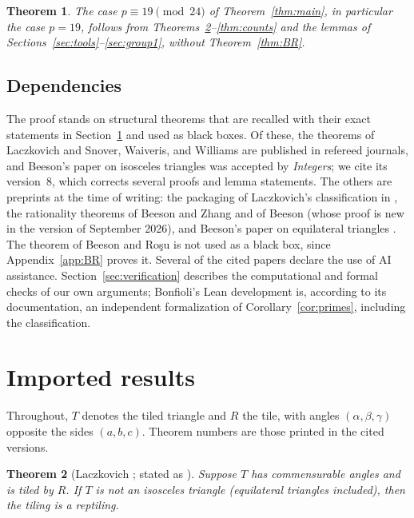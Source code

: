 \documentclass[11pt]{amsart}
\newtheorem{theorem}{Theorem}
\theoremstyle{remark}
\begin{document}
\begin{theorem}\label{thm:nineteen}
The case $p\equiv 19\pmod{24}$ of Theorem~\ref{thm:main}, in particular the case $p=19$, follows from Theorems~\ref{thm:commensurable}--\ref{thm:counts} and the lemmas of Sections~\ref{sec:tools}--\ref{sec:group1}, without Theorem~\ref{thm:BR}.
\end{theorem}

\subsection*{Dependencies}
The proof stands on structural theorems that are recalled with their exact statements in Section~\ref{sec:imports} and used as black boxes. Of these, the theorems of Laczkovich \cite{Lacz95,Lacz12} and Snover, Waiveris, and Williams \cite{SWW91} are published in refereed journals, and Beeson's paper on isosceles triangles \cite{BeesonIso} was accepted by \emph{Integers}; we cite its version~8, which corrects several proofs and lemma statements. The others are preprints at the time of writing: the packaging of Laczkovich's classification in \cite{BLZ633}, the rationality theorems of Beeson and Zhang \cite{BZRat} and of Beeson \cite[Theorem~9]{Beeson2229} (whose proof is new in the version of September 2026), and Beeson's paper on equilateral triangles \cite{BeesonEqui}. The theorem of Beeson and Ro\c{s}u \cite{BR} is not used as a black box, since Appendix~\ref{app:BR} proves it. Several of the cited papers declare the use of AI assistance. Section~\ref{sec:verification} describes the computational and formal checks of our own arguments; Bonfioli's Lean development \cite{Bonfioli2} is, according to its documentation, an independent formalization of Corollary~\ref{cor:primes}, including the classification.

\section{Imported results}\label{sec:imports}

Throughout, $T$ denotes the tiled triangle and $R$ the tile, with angles $(\alpha,\beta,\gamma)$ opposite the sides $(a,b,c)$. Theorem numbers are those printed in the cited versions.

\begin{theorem}[{Laczkovich \cite{Lacz95,Lacz12}; stated as \cite[Theorem~5]{BLZ633}}]\label{thm:commensurable}
Suppose $T$ has commensurable angles and is tiled by $R$. If $T$ is not an isosceles triangle (equilateral triangles included), then the tiling is a reptiling.
\end{theorem}
\end{document}
